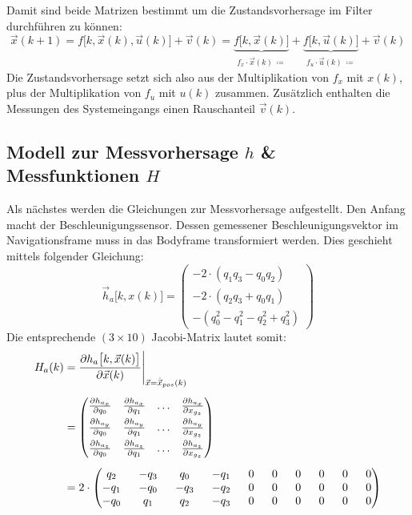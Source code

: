 \documentclass[12pt,a4paper]{article}
\newcommand{\PA}[2]{\frac{\partial #1}{\partial #2}}
\begin{document}
		Damit sind beide Matrizen bestimmt um die Zustandsvorhersage im Filter durchführen zu können:
		\begin{equation}
			\vec{x}(k+1)=f\big[k,\vec{x}(k),\vec{u}(k)\big]+\vec{v}(k)=\underbrace{f\big[k,\vec{x}(k)\big]}_{\substack{f_{x}\cdot \vec{x}(k)~\coloneqq}}+\underbrace{f\big[k,\vec{u}(k)\big]}_{\substack{f_{u}\cdot \vec{u}(k)~\coloneqq}}+\vec{v}(k)
		\end{equation}
		Die Zustandsvorhersage setzt sich also aus der Multiplikation von $f_{x}$ mit $x(k)$, plus der Multiplikation von $f_{u}$ mit $u(k)$ zusammen. Zusätzlich enthalten die Messungen des Systemeingangs einen Rauschanteil $\vec{v}(k)$.
		\subsection{Modell zur Messvorhersage $h$ \& Messfunktionen $H$}\label{subsec:ModellMessvorhersage}
		Als nächstes werden die Gleichungen zur Messvorhersage aufgestellt. Den Anfang macht der Beschleunigungssensor. Dessen gemessener Beschleunigungsvektor im Navigationsframe muss in das Bodyframe transformiert werden. Dies geschieht mittels folgender Gleichung:
		\begin{equation}\label{eq:MessvorhersageBeschleunigungssensor}
			\vec{h}_{a}\big[k,x(k)\big]=\begin{pmatrix}
			-2\cdot(q_{1}q_{3}-q_{0}q_{2})\\[0.4em]
			-2\cdot(q_{2}q_{3}+q_{0}q_{1})\\[0.4em]
			-(q_{0}^{2}-q_{1}^{2}-q_{2}^{2}+q_{3}^{2})
			\end{pmatrix}
		\end{equation}
		Die entsprechende $(3\times 10)$ Jacobi-Matrix lautet somit:
		\begin{equation}
			\begin{split}
				H_{a}(k)&=\frac{\partial h_{a}\big[k,\vec{x}(k)\big]}{\partial \vec{x}(k)}\Bigg \vert_{\vec{x}=\hat{\vec{x}}_{pos}(k)}\\[0.5em]
				&=\begin{pmatrix}
				\PA{h_{a_{x}}}{q_{0}} & \PA{h_{a_{x}}}{q_{1}} & \ldots & \PA{h_{a_{x}}}{x_{g_{z}}} \\[0.5em]
				\PA{h_{a_{y}}}{q_{0}} & \PA{h_{a_{y}}}{q_{1}} & \ldots & \PA{h_{a_{y}}}{x_{g_{z}}} \\[0.5em]
				\PA{h_{a_{z}}}{q_{0}} & \PA{h_{a_{z}}}{q_{1}} & \ldots & \PA{h_{a_{z}}}{x_{g_{z}}}
				\end{pmatrix}\\[0.5em]
				&=2\cdot
				\setlength{\arraycolsep}{8pt}
				\begin{pmatrix}
				q_{2} & -q_{3} & q_{0} & -q_{1} & 0 & 0 & 0 & 0 & 0 & 0 \\
				-q_{1} & -q_{0} & -q_{3} & -q_{2} & 0 & 0 & 0 & 0 & 0 & 0 \\
				-q_{0} & q_{1} & q_{2} & -q_{3} & 0 & 0 & 0 & 0 & 0 & 0
				\end{pmatrix}
			\end{split}
		\end{equation}\\
\end{document}
